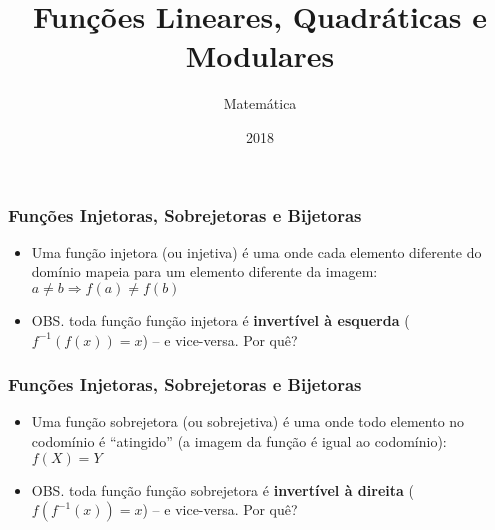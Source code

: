 \documentclass[usenames,dvipsnames,svgnames]{beamer}
\title{Funções Lineares, Quadráticas e Modulares}
\author{Matemática}
\institute{ONGEP}
\date{2018}
\begin{document}
\frame{\titlepage}

\begin{frame}	
	\frametitle{Funções Injetoras, Sobrejetoras e Bijetoras}

	\begin{itemize}
		\item Uma função injetora (ou injetiva) é uma onde cada elemento diferente do domínio mapeia para um elemento diferente da imagem: $a \neq b \Rightarrow f(a) \neq f(b)$
		\item OBS. toda função função injetora é \textbf{invertível à esquerda} ($f^{-1}(f(x)) = x$) -- e vice-versa. Por quê?
	\end{itemize}

	\begin{adjustbox}{max totalsize={\textwidth}{.65\textheight},center}
	\end{adjustbox}
\end{frame}

\begin{frame}	
	\frametitle{Funções Injetoras, Sobrejetoras e Bijetoras}

	\begin{itemize}
		\item Uma função sobrejetora (ou sobrejetiva) é uma onde todo elemento no codomínio é ``atingido'' (a imagem da função é igual ao codomínio): $f(X) = Y$
		\item OBS. toda função função sobrejetora é \textbf{invertível à direita} ($f(f^{-1}(x)) = x$) -- e vice-versa. Por quê?
	\end{itemize}

	\begin{adjustbox}{max totalsize={\textwidth}{.65\textheight},center}
	\end{adjustbox}
\end{frame}
\end{document}
